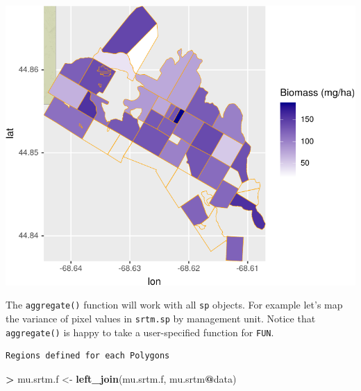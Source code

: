 \documentclass[]{krantz}
\makeatletter
\newenvironment{Shaded}{\begin{snugshade}}{\end{snugshade}}
\newcommand{\ControlFlowTok}[1]{\textcolor[rgb]{0.27,0.27,0.27}{\textbf{#1}}}
\newcommand{\DataTypeTok}[1]{\textcolor[rgb]{0.27,0.27,0.27}{#1}}
\newcommand{\ErrorTok}[1]{\textcolor[rgb]{0.14,0.14,0.14}{\textbf{#1}}}
\newcommand{\KeywordTok}[1]{\textcolor[rgb]{0.27,0.27,0.27}{\textbf{#1}}}
\newcommand{\NormalTok}[1]{#1}
\newcommand{\OperatorTok}[1]{\textcolor[rgb]{0.43,0.43,0.43}{\textbf{#1}}}
\newcommand{\StringTok}[1]{\textcolor[rgb]{0.5,0.5,0.5}{#1}}
\newenvironment{kframe}{%
\medskip{}
\setlength{\fboxsep}{.8em}
 \def\at@end@of@kframe{}%
 \ifinner\ifhmode%
  \def\at@end@of@kframe{\end{minipage}}%
  \begin{minipage}{\columnwidth}%
 \fi\fi%
 \def\FrameCommand##1{\hskip\@totalleftmargin \hskip-\fboxsep
 \colorbox{shadecolor}{##1}\hskip-\fboxsep
     \hskip-\linewidth \hskip-\@totalleftmargin \hskip\columnwidth}%
 \MakeFramed {\advance\hsize-\width
   \@totalleftmargin\z@ \linewidth\hsize
   \@setminipage}}%
 {\par\unskip\endMakeFramed%
 \at@end@of@kframe}
\renewenvironment{Shaded}{\begin{kframe}}{\end{kframe}}
\makeatother
\begin{document}
\includegraphics{bookdown_files/figure-latex/unnamed-chunk-206-1.pdf}

The \texttt{aggregate()} function will work with all \texttt{sp} objects. For example let's map the variance of pixel values in \texttt{srtm.sp} by management unit. Notice that \texttt{aggregate()} is happy to take a user-specified function for \texttt{FUN}.

\begin{Shaded}
\end{Shaded}

\begin{verbatim}
Regions defined for each Polygons
\end{verbatim}

\begin{Shaded}
\begin{Highlighting}[]
\OperatorTok{>}\StringTok{ }\NormalTok{mu.srtm.f <-}\StringTok{ }\KeywordTok{left_join}\NormalTok{(mu.srtm.f, mu.srtm}\OperatorTok{@}\NormalTok{data)}
\end{Highlighting}
\end{Shaded}
\end{document}
